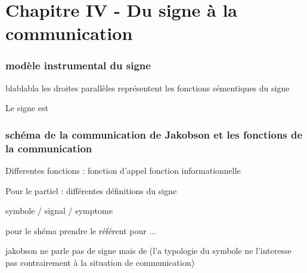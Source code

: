 \part{Chapitre IV - Du signe à la communication}
\section{modèle instrumental du signe}
blablabla
les droites parallèles représentent les fonctions sémentiques du signe

Le signe est 
\section{schéma de la communication de Jakobson et les fonctions de la communication}





Differentes fonctions : 
fonction d'appel 
fonction informationnelle



Pour le partiel : différentes définitions du signe


symbole / signal / symptome

pour le shéma prendre le référent pour ...

jakobson ne parle pas de signe mais de (l'a typologie du symbole ne l'interesse pas contrairement à la situation de communication)
